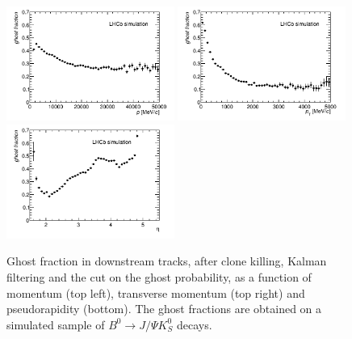 \begin{figure}[tbph]
\begin{center}
\includegraphics[width = 0.49\textwidth]{figures/EffPatLLT/overall/BJpsiKSGhostFracP_TBTC.png}
\includegraphics[width = 0.49\textwidth]{figures/EffPatLLT/overall/BJpsiKSGhostFracPt_TBTC.png}
\includegraphics[width = 0.49\textwidth]{figures/EffPatLLT/overall/BJpsiKSGhostFracEta_TBTC.png}
\caption{Ghost fraction in downstream tracks, after clone killing, Kalman
filtering and the cut on the ghost probability, as a function of momentum (top
left), transverse momentum (top right) and pseudorapidity (bottom). The ghost
fractions are obtained on a simulated sample of $B^{0} \rightarrow J/\Psi K^{0}_{S}$ decays.}
\label{fig:ghostPatLLTBJpsiK_TBTC}
 \end{center}
 \end{figure}


